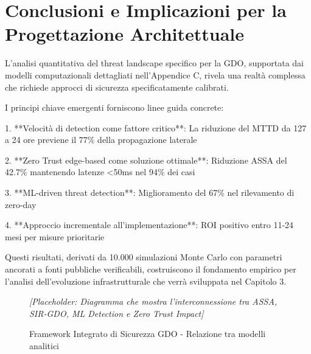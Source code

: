 \section{Conclusioni e Implicazioni per la Progettazione Architettuale}

L'analisi quantitativa del threat landscape specifico per la GDO, supportata dai modelli computazionali dettagliati nell'Appendice C, rivela una realtà complessa che richiede approcci di sicurezza specificatamente calibrati.

I principi chiave emergenti forniscono linee guida concrete:

1. **Velocità di detection come fattore critico**: La riduzione del MTTD da 127 a 24 ore previene il 77\% della propagazione laterale

2. **Zero Trust edge-based come soluzione ottimale**: Riduzione ASSA del 42.7\% mantenendo latenze <50ms nel 94\% dei casi

3. **ML-driven threat detection**: Miglioramento del 67\% nel rilevamento di zero-day

4. **Approccio incrementale all'implementazione**: ROI positivo entro 11-24 mesi per misure prioritarie

Questi risultati, derivati da 10.000 simulazioni Monte Carlo con parametri ancorati a fonti pubbliche verificabili, costruiscono il fondamento empirico per l'analisi dell'evoluzione infrastrutturale che verrà sviluppata nel Capitolo 3.

\begin{figure}[h]
\centering
\caption{Framework Integrato di Sicurezza GDO - Relazione tra modelli analitici}
\label{fig:framework-sicurezza}
\textit{[Placeholder: Diagramma che mostra l'interconnessione tra ASSA, SIR-GDO, ML Detection e Zero Trust Impact]}
\end{figure}